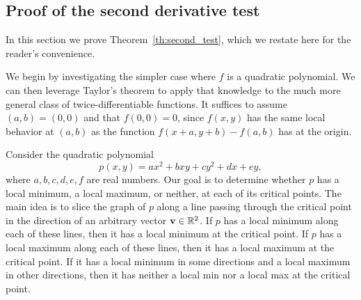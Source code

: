 \documentclass[prettycode,shellescape]{watsonbook}
\begin{document}
\newpage

\subsection{Proof of the second derivative test} \label{sec:proof_sdt}

In this section we prove Theorem~\ref{th:second_test}, which we
restate here for the reader's convenience.

\begin{theo}{}{}
  \secondderivativetest
\end{theo}

\begin{pf}
  We begin by investigating the simpler case where $f$ is a quadratic
  polynomial. We can then leverage Taylor's theorem to apply that
  knowledge to the much more general class of twice-differentiable
  functions. It suffices to assume $(a,b) = (0,0)$ and that
  $f(0,0) = 0$, since $f(x,y)$ has the same local behavior at $(a,b)$
  as the function $f(x+a, y+b)-f(a,b)$ has at the origin.
  
  Consider the quadratic polynomial 
  \[
    p(x,y) = ax^2  + b xy + cy^2 + dx + ey, 
  \]
  where $a,b,c,d,e,f$ are real numbers.  Our goal is to determine
  whether $p$ has a local minimum, a local maximum, or neither, at
  each of its critical points. The main idea is to slice the graph of
  $p$ along a line passing through the critical point in the direction
  of an arbitrary vector $\mathbf{v} \in \mathbb{R}^2$. If $p$ has a local
  minimum along each of these lines, then it has a local minimum at
  the critical point.  If $p$ has a local maximum along each of these
  lines, then it has a local maximum at the critical point. If it has
  a local minimum in some directions and a local maximum in other
  directions, then it has neither a local min nor a local max at the
  critical point.
  

\end{pf}
\end{document}
